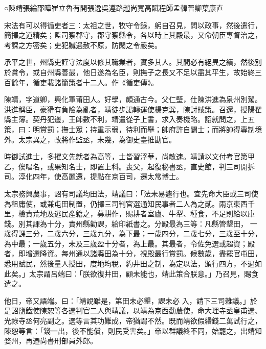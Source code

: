 
\begin{pinyinscope}

 ○陳靖張綸邵曄崔立魯有開張逸吳遵路趙尚寬高賦程師孟韓晉卿葉康直



 宋法有可以得循吏者三：太祖之世，牧守令錄，躬自召見，問以政事，然後遣行，簡擇之道精矣；監司察郡守，郡守察縣令，各以時上其殿最，又命朝臣專督治之，考課之方密矣；吏犯贓遇赦不原，防閑之令嚴矣。



 承平之世，州縣吏謹守法度以修其職業者，實多其人。其間必有絕異之績，然後別於賞令，或自州縣善最，他日遂為名臣，則撫子之長又不足以盡其平生，故始終三百餘年，循吏載諸簡策者十二人。作《循吏傳》。



 陳靖，字道卿，興化軍莆田人。好學，頗通古今。父仁壁，仕陳洪進為泉州別駕。洪進稱臣，豪猾有負險為亂者，靖徒步謁轉運使楊克巽，陳討賊策。召還，授陽翟縣主簿。契丹犯邊，王師數不利，靖遣從子上書，求入奏機略。詔就問之，上五策，曰：明賞罰；撫士眾；持重示弱，待利而舉；帥府許自闢士；而將帥得專制境外。太宗異之，改將作監丞，未幾，為御史臺推勘官。



 時御試進士，多擢文先就者為高等，士皆習浮華，尚敏速。靖請以文付考官第甲
 乙，俟唱名，或果知名士，即置上科。喪父，起復秘書丞，直史館，判三司開拆司。淳化四年，使高麗還，提點在京百司，遷太常博士。



 太宗務興農事，詔有司議均田法，靖議曰：「法未易遽行也。宜先命大臣或三司使為租庸使，或兼屯田制置，仍擇三司判官選通知民事者二人為之貳。兩京東西千里，檢責荒地及逃民產籍之，募耕作，賜耕者室廬、牛犁、種食，不足則給以庫錢。別其課為十分，責州縣勸課，給印紙書之。分殿最為三等：凡縣管墾田，
 一歲得課三分，二歲六分，三歲九分，為下最；一歲四分，二歲七分，三歲至十分，為中最；一歲五分，未及三歲盈十分者，為上最。其最者，令佐免選或超資；殿者，即增選降資。每州通以諸縣田為十分，視殿最行賞罰。候數歲，盡罷官屯田，悉用賦民，然後量人授田，度地均稅，約井田之制，為定以法，頒行四方，不過如此矣。」太宗謂呂端曰：「朕欲復井田，顧未能也，靖此策合朕意。」乃召見，賜食遣之。



 他日，帝又語端。曰：「靖說雖是，第田未必墾，課未必
 入，請下三司雜議。」於是詔鹽鐵使陳恕等各選判官二人與靖議，以靖為京西勸農使，命大理寺丞皇甫選、光祿寺丞何亮副之。選等言其功難成，帝猶謂不然。既而靖欲假緡錢二萬試行之，陳恕等言：「錢一出，後不能償，則民受害矣。」帝以群議終不同，始罷之，出靖知婺州，再遷尚書刑部員外郎。




\end{pinyinscope}
